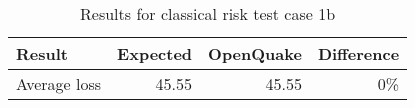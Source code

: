 \begin{table}[htbp]

\centering
\begin{tabular}{ l r r r }

\hline
\rowcolor{anti-flashwhite}
\bf{Result} & \bf{Expected} & \bf{OpenQuake} & \bf{Difference}\\
\hline
Average loss & 45.55 & 45.55 & 0\% \\
\hline
\end{tabular}

\caption{Results for classical risk test case 1b}
\label{tab:result-cr-1b}
\end{table}